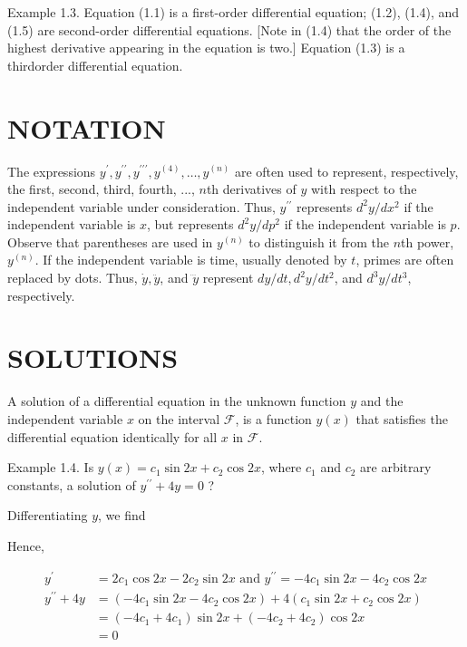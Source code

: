 \documentclass[10pt]{article}
\begin{document}
Example 1.3. Equation (1.1) is a first-order differential equation; (1.2), (1.4), and (1.5) are second-order differential equations. [Note in (1.4) that the order of the highest derivative appearing in the equation is two.] Equation (1.3) is a thirdorder differential equation.

\section*{NOTATION}
The expressions $y^{\prime}, y^{\prime \prime}, y^{\prime \prime \prime}, y^{(4)}, \ldots, y^{(n)}$ are often used to represent, respectively, the first, second, third, fourth, ..., $n$th derivatives of $y$ with respect to the independent variable under consideration. Thus, $y^{\prime \prime}$ represents $d^{2} y / d x^{2}$ if the independent variable is $x$, but represents $d^{2} y / d p^{2}$ if the independent variable is $p$. Observe that parentheses are used in $y^{(n)}$ to distinguish it from the $n$th power, $y^{(n)}$. If the independent variable is time, usually denoted by $t$, primes are often replaced by dots. Thus, $\dot{y}, \ddot{y}$, and $\dddot{y}$ represent $d y / d t, d^{2} y / d t^{2}$, and $d^{3} y / d t^{3}$, respectively.

\section*{SOLUTIONS}
A solution of a differential equation in the unknown function $y$ and the independent variable $x$ on the interval $\mathscr{F}$, is a function $y(x)$ that satisfies the differential equation identically for all $x$ in $\mathscr{F}$.

Example 1.4. Is $y(x)=c_{1} \sin 2 x+c_{2} \cos 2 x$, where $c_{1}$ and $c_{2}$ are arbitrary constants, a solution of $y^{\prime \prime}+4 y=0$ ?

Differentiating $y$, we find

Hence,

$$
\begin{aligned}
y^{\prime} & =2 c_{1} \cos 2 x-2 c_{2} \sin 2 x \text { and } y^{\prime \prime}=-4 c_{1} \sin 2 x-4 c_{2} \cos 2 x \\
y^{\prime \prime}+4 y & =\left(-4 c_{1} \sin 2 x-4 c_{2} \cos 2 x\right)+4\left(c_{1} \sin 2 x+c_{2} \cos 2 x\right) \\
& =\left(-4 c_{1}+4 c_{1}\right) \sin 2 x+\left(-4 c_{2}+4 c_{2}\right) \cos 2 x \\
& =0
\end{aligned}
$$
\end{document}
